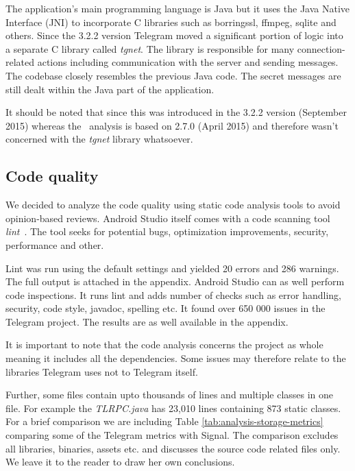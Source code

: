 \documentclass[thesis=M,english]{FITthesis}[2012/10/20]
\begin{document}
The application's main programming language is Java but it uses the Java Native Interface (JNI) to incorporate C libraries such as borringssl, ffmpeg, sqlite and others. Since the 3.2.2 version Telegram moved a significant portion of logic into a separate C library called \emph{tgnet}. The library is responsible for many connection-related actions including communication with the server and sending messages. The codebase closely resembles the previous Java code. The secret messages are still dealt within the Java part of the application.

It should be noted that since this was introduced in the 3.2.2 version (September 2015) whereas the~\cite{telegram-aarhus} analysis is based on 2.7.0 (April 2015) and therefore wasn't concerned with the \emph{tgnet} library whatsoever.

\subsection{Code quality}

We decided to analyze the code quality using static code analysis tools to avoid opinion-based reviews. Android Studio itself comes with a code scanning tool \emph{lint}~\cite{android-studio-lint}. The tool seeks for potential bugs, optimization improvements, security, performance and other.

Lint was run using the default settings and yielded 20 errors and 286 warnings. The full output is attached in the appendix. Android Studio can as well perform code inspections. It runs lint and adds number of checks such as error handling, security, code style, javadoc, spelling etc. It found over 650 000 issues in the Telegram project. The results are as well available in the appendix. %

It is important to note that the code analysis concerns the project as whole meaning it includes all the dependencies. Some issues may therefore relate to the libraries Telegram uses not to Telegram itself.

Further, some files contain upto thousands of lines and multiple classes in one file. For example the \emph{TLRPC.java} has 23,010 lines containing 873 static classes. For a brief comparison we are including Table \ref{tab:analysis-storage-metrics} comparing some of the Telegram metrics with Signal. The comparison excludes all libraries, binaries, assets etc. and discusses the source code related files only. We leave it to the reader to draw her own conclusions.
\end{document}
